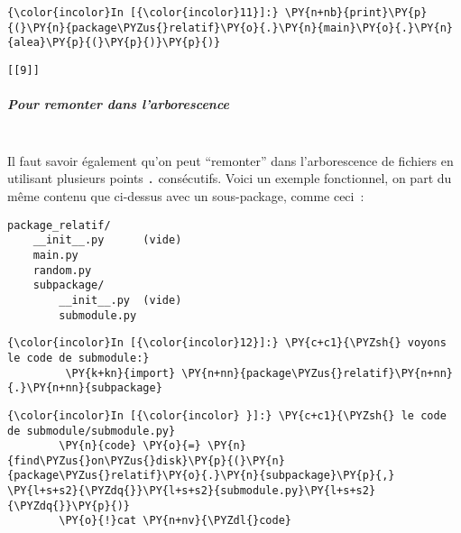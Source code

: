     \begin{Verbatim}[commandchars=\\\{\}]
{\color{incolor}In [{\color{incolor}11}]:} \PY{n+nb}{print}\PY{p}{(}\PY{n}{package\PYZus{}relatif}\PY{o}{.}\PY{n}{main}\PY{o}{.}\PY{n}{alea}\PY{p}{(}\PY{p}{)}\PY{p}{)}
\end{Verbatim}


    \begin{Verbatim}[commandchars=\\\{\}]
[[9]]

    \end{Verbatim}

    \hypertarget{pour-remonter-dans-larborescence}{%
\subparagraph{Pour remonter dans
l'arborescence\\\\}\label{pour-remonter-dans-larborescence}}

    Il faut savoir également qu'on peut ``remonter'' dans l'arborescence de
fichiers en utilisant plusieurs points \texttt{.} consécutifs. Voici un
exemple fonctionnel, on part du même contenu que ci-dessus avec un
sous-package, comme ceci~:

    \begin{verbatim}
package_relatif/
    __init__.py      (vide)
    main.py
    random.py
    subpackage/
        __init__.py  (vide)
        submodule.py
\end{verbatim}

    \begin{Verbatim}[commandchars=\\\{\}]
{\color{incolor}In [{\color{incolor}12}]:} \PY{c+c1}{\PYZsh{} voyons le code de submodule:}
         \PY{k+kn}{import} \PY{n+nn}{package\PYZus{}relatif}\PY{n+nn}{.}\PY{n+nn}{subpackage}
\end{Verbatim}


    \begin{Verbatim}[commandchars=\\\{\}]
{\color{incolor}In [{\color{incolor} }]:} \PY{c+c1}{\PYZsh{} le code de submodule/submodule.py}
        \PY{n}{code} \PY{o}{=} \PY{n}{find\PYZus{}on\PYZus{}disk}\PY{p}{(}\PY{n}{package\PYZus{}relatif}\PY{o}{.}\PY{n}{subpackage}\PY{p}{,} \PY{l+s+s2}{\PYZdq{}}\PY{l+s+s2}{submodule.py}\PY{l+s+s2}{\PYZdq{}}\PY{p}{)}
        \PY{o}{!}cat \PY{n+nv}{\PYZdl{}code}
\end{Verbatim}


